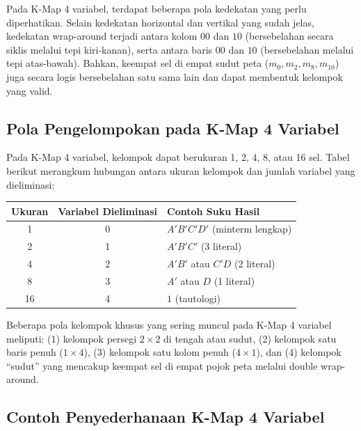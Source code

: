 Pada K-Map 4 variabel, terdapat beberapa pola kedekatan yang perlu diperhatikan. Selain kedekatan horizontal dan vertikal yang sudah jelas, kedekatan wrap-around terjadi antara kolom $00$ dan $10$ (bersebelahan secara siklis melalui tepi kiri-kanan), serta antara baris $00$ dan $10$ (bersebelahan melalui tepi atas-bawah). Bahkan, keempat sel di empat sudut peta ($m_0, m_2, m_8, m_{10}$) juga secara logis bersebelahan satu sama lain dan dapat membentuk kelompok yang valid.

\subsection{Pola Pengelompokan pada K-Map 4 Variabel}

Pada K-Map 4 variabel, kelompok dapat berukuran 1, 2, 4, 8, atau 16 sel. Tabel berikut merangkum hubungan antara ukuran kelompok dan jumlah variabel yang dieliminasi:

\begin{center}
\renewcommand{\arraystretch}{1.2}
\begin{tabular}{|c|c|l|}
\hline
\textbf{Ukuran} & \textbf{Variabel Dieliminasi} & \textbf{Contoh Suku Hasil} \\ \hline
1 & 0 & $A'B'C'D'$ (minterm lengkap) \\ \hline
2 & 1 & $A'B'C'$ (3 literal) \\ \hline
4 & 2 & $A'B'$ atau $C'D$ (2 literal) \\ \hline
8 & 3 & $A'$ atau $D$ (1 literal) \\ \hline
16 & 4 & $1$ (tautologi) \\ \hline
\end{tabular}
\end{center}

Beberapa pola kelompok khusus yang sering muncul pada K-Map 4 variabel meliputi: (1) kelompok persegi $2 \times 2$ di tengah atau sudut, (2) kelompok satu baris penuh ($1 \times 4$), (3) kelompok satu kolom penuh ($4 \times 1$), dan (4) kelompok ``sudut'' yang mencakup keempat sel di empat pojok peta melalui double wrap-around.

\subsection{Contoh Penyederhanaan K-Map 4 Variabel}

